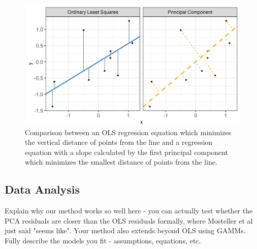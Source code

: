 \documentclass[
  letterpaper,
  DIV=11,
  numbers=noendperiod]{scrartcl}
\newcommand{\svp}[1]{{\textcolor{RedOrange}{#1}}}
\begin{document}
\begin{figure}[ht]
\begin{center}
\centerline{\includegraphics[width=\columnwidth]{images/pca-plot}}
\caption{Comparison between an OLS regression equation which minimizes the vertical distance of points from the line and a regression equation with a slope calculated by the first principal component which minimizes the smallest distance of points from the line.}
\label{pca-plot}
\end{center}
\end{figure}

\hypertarget{data-analysis}{%
\subsection{Data Analysis}\label{data-analysis}}

\svp{Explain why our method works so well here - you can actually test whether the PCA residuals are closer than the OLS residuals formally, where Mosteller et al just said "seems like". Your method also extends beyond OLS using GAMMs. Fully describe the models you fit - assumptions, equations, etc.}
\end{document}
